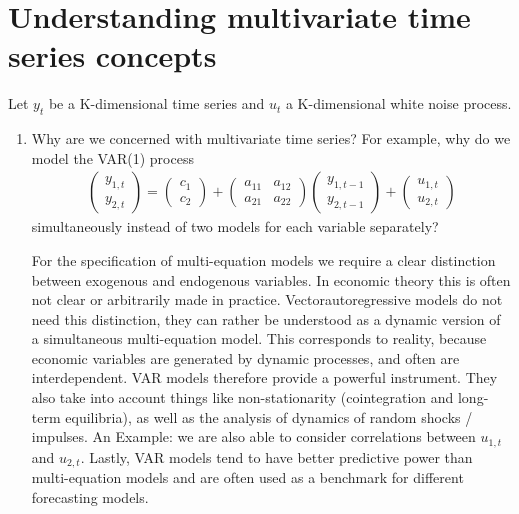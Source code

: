 \documentclass[a4paper]{scrartcl}
\begin{document}
\section{Understanding multivariate time series concepts}
Let $y_t$ be a K-dimensional time series and $u_t$ a K-dimensional white noise process.
\begin{enumerate}
\item Why are we concerned with multivariate time series? For example, why do we model the VAR(1) process
	\begin{align*}
	\begin{pmatrix}y_{1,t}\\ y_{2,t}\end{pmatrix} = \begin{pmatrix} c_1 \\ c_2\end{pmatrix} + \begin{pmatrix}a_{11} & a_{12}\\ a_{21} & a_{22} \end{pmatrix} \begin{pmatrix}y_{1,{t-1}}\\ y_{2,{t-1}}\end{pmatrix} + \begin{pmatrix}u_{1,t}\\ u_{2,t}\end{pmatrix}
	\end{align*}
	simultaneously instead of two models for each variable separately?
	\begin{solution}
	For the specification of multi-equation models we require a clear distinction between exogenous and endogenous variables. In economic theory this is often not clear or arbitrarily made in practice. Vectorautoregressive models do not need this distinction, they can rather be understood as a dynamic version of a simultaneous multi-equation model. This corresponds to reality, because economic variables are generated by dynamic processes, and often are interdependent. VAR models therefore provide a powerful instrument. They also take into account things like non-stationarity (cointegration and long-term equilibria), as well as the analysis of dynamics of random shocks / impulses. An Example: we are also able to consider correlations between $ u_ {1, t} $ and $ u_ {2, t} $. Lastly, VAR models tend to have better predictive power than multi-equation models and are often used as a benchmark for different forecasting models.
	

\end{solution}
\end{enumerate}
\end{document}

